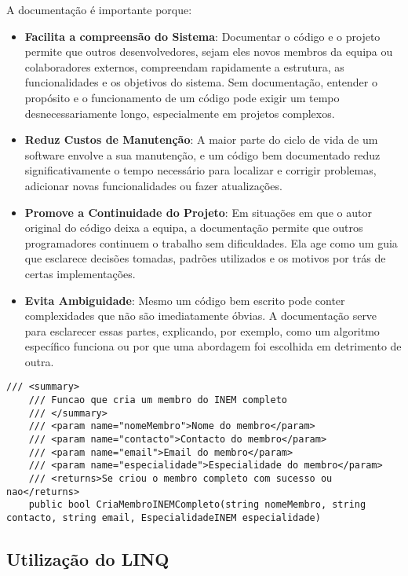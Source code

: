 \documentclass[11pt]{scrartcl} %
\begin{document}
A documentação é importante porque:

\begin{itemize}
	\item \textbf{Facilita a compreensão do Sistema}: Documentar o código e o projeto permite que outros desenvolvedores, sejam eles novos membros da equipa ou colaboradores externos, compreendam rapidamente a estrutura, as funcionalidades e os objetivos do sistema. Sem documentação, entender o propósito e o funcionamento de um código pode exigir um tempo desnecessariamente longo, especialmente em projetos complexos.
	\item \textbf{Reduz Custos de Manutenção}: A maior parte do ciclo de vida de um software envolve a sua manutenção, e um código bem documentado reduz significativamente o tempo necessário para localizar e corrigir problemas, adicionar novas funcionalidades ou fazer atualizações. 
	\item \textbf{Promove a Continuidade do Projeto}: Em situações em que o autor original do código deixa a equipa, a documentação permite que outros programadores continuem o trabalho sem dificuldades. Ela age como um guia que esclarece decisões tomadas, padrões utilizados e os motivos por trás de certas implementações.
	\item \textbf{Evita Ambiguidade}: Mesmo um código bem escrito pode conter complexidades que não são imediatamente óbvias. A documentação serve para esclarecer essas partes, explicando, por exemplo, como um algoritmo específico funciona ou por que uma abordagem foi escolhida em detrimento de outra.
\end{itemize}

\begin{lstlisting}[language={[Sharp]C}, caption={Exemplo de Documentação}, label={Documentação}]
	/// <summary>
	/// Funcao que cria um membro do INEM completo
	/// </summary>
	/// <param name="nomeMembro">Nome do membro</param>
	/// <param name="contacto">Contacto do membro</param>
	/// <param name="email">Email do membro</param>
	/// <param name="especialidade">Especialidade do membro</param>
	/// <returns>Se criou o membro completo com sucesso ou nao</returns>
	public bool CriaMembroINEMCompleto(string nomeMembro, string contacto, string email, EspecialidadeINEM especialidade)
	\end{lstlisting}

\subsection{Utilização do LINQ}
\end{document}
